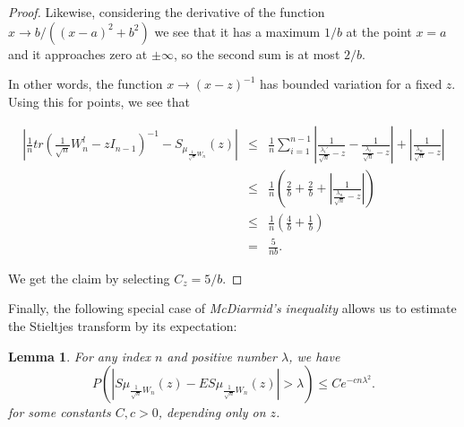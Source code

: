 \documentclass[12pt,a4paper,leqno]{report}
\theoremstyle{plain}
\newtheorem{lem}[equation]{Lemma}
\theoremstyle{definition}
\theoremstyle{remark}
\begin{document}
\begin{proof}
Likewise, considering the derivative of the function $x \to b/((x-a)^2+b^2)$ we see that it has a maximum $1/b$ at the point $x=a$ and it approaches zero at $\pm \infty$, so the second sum is at most $2/b$.

In other words, the function $x \to (x-z)^{-1}$ has bounded variation for a fixed $z$. Using this for points, we see that  

\begin{eqnarray*}
\left|\frac{1}{n}tr(\frac{1}{\sqrt{n}}W_n^l-zI_{n-1})^{-1} - S_{\mu_{\frac{1}{\sqrt{n}}W_n}}(z)\right| 
& \leq & \frac{1}{n}
\sum_{i=1}^{n-1} \left|\frac{1}{\frac{\lambda_i'}{\sqrt{n}}-z} - \frac{1}{\frac{\lambda_i}{\sqrt{n}}-z}\right| + \left|\frac{1}{\frac{\lambda_n}{\sqrt{n}}-z}\right|\\
& \leq & \frac{1}{n} \left(\frac{2}{b} + \frac{2}{b}  + \left|\frac{1}{\frac{\lambda_n}{\sqrt{n}}-z}\right|\right)\\
& \leq &  \frac{1}{n} \left( \frac{4}{b} + \frac{1}{b} \right)\\
& = & \frac{5}{nb}.
\end{eqnarray*}

We get the claim by selecting $C_z = 5/b$.
\end{proof}

Finally, the following special case of \emph{McDiarmid's inequality}\cite{McD} allows us to estimate the Stieltjes transform by its expectation:

\begin{lem}
For any index $n$ and positive number $\lambda$, we have
\begin{equation*}
P(|S\mu_{\frac{1}{\sqrt{n}}W_n}(z)- ES\mu_{\frac{1}{\sqrt{n}}W_n}(z)|>\lambda) \leq Ce^{-cn\lambda^2}.
\end{equation*}
for some constants $C, c > 0$, depending only on $z$.
\end{lem}
\end{document}

